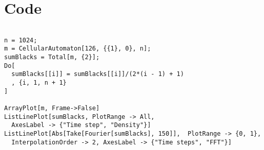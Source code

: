 \appendix
\section{Code}

\begin{verbatim}

n = 1024;
m = CellularAutomaton[126, {{1}, 0}, n];
sumBlacks = Total[m, {2}]; 
Do[
  sumBlacks[[i]] = sumBlacks[[i]]/(2*(i - 1) + 1)
  , {i, 1, n + 1}
]

ArrayPlot[m, Frame->False]
ListLinePlot[sumBlacks, PlotRange -> All, 
  AxesLabel -> {"Time step", "Density"}]
ListLinePlot[Abs[Take[Fourier[sumBlacks], 150]],  PlotRange -> {0, 1},
  InterpolationOrder -> 2, AxesLabel -> {"Time steps", "FFT"}]


\end{verbatim}
